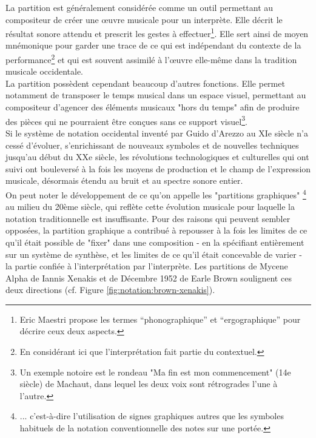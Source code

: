 \noindent La partition est généralement considérée comme un outil permettant au compositeur de créer une œuvre musicale pour un interprète. Elle décrit le résultat sonore attendu et prescrit les gestes à effectuer\footnote{Eric Maestri propose les termes “phonographique” et “ergographique” pour décrire ceux deux aspects.}. Elle sert ainsi de moyen mnémonique pour garder une trace de ce qui est indépendant du contexte de la performance\footnote{En considérant ici que l'interprétation fait partie du contextuel.} et qui est souvent assimilé à l'œuvre elle-même dans la tradition musicale occidentale.\\
\indent La partition possèdent cependant beaucoup d'autres fonctions. Elle permet notamment de transposer le temps musical dans un espace visuel, permettant au compositeur d'agencer des éléments musicaux "hors du temps" afin de produire des pièces qui ne pourraient être conçues sans ce support visuel\footnote{Un exemple notoire est le rondeau "Ma fin est mon commencement" (14e siècle) de Machaut, dans lequel les deux voix sont rétrogrades l'une à l'autre.}.\\
\indent Si le système de notation occidental inventé par Guido d'Arezzo au XIe siècle n'a cessé d'évoluer, s'enrichissant de nouveaux symboles et de nouvelles techniques jusqu'au début du XXe siècle, les révolutions technologiques et culturelles qui ont suivi ont bouleversé à la fois les moyens de production et le champ de l'expression musicale, désormais étendu au bruit et au spectre sonore entier.\\
\indent On peut noter le développement de ce qu'on appelle les "partitions graphiques" \footnote{... c'est-à-dire l'utilisation de signes graphiques autres que les symboles habituels de la notation conventionnelle des notes sur une portée.} au milieu du 20ème siècle, qui reflète cette évolution musicale pour laquelle la notation traditionnelle est insuffisante.  Pour des raisons qui peuvent sembler opposées, la partition graphique a contribué à repousser à la fois les limites de ce qu'il était possible de "fixer" dans une composition - en la spécifiant entièrement sur un système de synthèse, et les limites de ce qu'il était concevable de varier - la partie confiée à l'interprétation par l'interprète.  Les partitions de Mycene Alpha de Iannis Xenakis et de Décembre 1952 de Earle Brown soulignent ces deux directions (cf. Figure \ref{fig:notation:brown-xenakis}).

